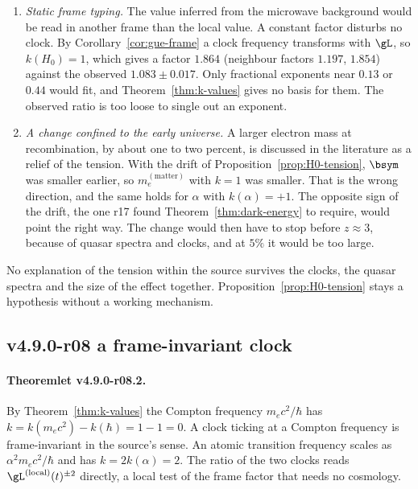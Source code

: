 \begin{enumerate}[leftmargin=2em]
\item \emph{Static frame typing.}  The value inferred from the microwave background would be read in another frame than
the local value.  A constant factor disturbs no clock.  By Corollary~\ref{cor:gue-frame} a clock frequency transforms with
\(\gL\), so \(k(H_0)=1\), which gives a factor \(1.864\) (neighbour factors \(1.197\), \(1.854\)) against the observed
\(1.083\pm0.017\).  Only fractional exponents near \(0.13\) or \(0.44\) would fit, and Theorem~\ref{thm:k-values} gives no
basis for them.  The observed ratio is too loose to single out an exponent.
\item \emph{A change confined to the early universe.}  A larger electron mass at recombination, by about one to two
percent, is discussed in the literature as a relief of the tension.  With the drift of
Proposition~\ref{prop:H0-tension}, \(\bsym\) was smaller earlier, so \(m_e^{(\mathrm{matter})}\) with \(k=1\) was smaller.
That is the wrong direction, and the same holds for \(\alpha\) with \(k(\alpha)=+1\).  The opposite sign of the drift, the one
r17 found Theorem~\ref{thm:dark-energy} to require, would point the right way.  The change would then have to stop before
\(z\approx3\), because of quasar spectra and clocks, and at \(5\%\) it would be too large.
\end{enumerate}
No explanation of the tension within the source survives the clocks, the quasar spectra and the size of the effect
together.  Proposition~\ref{prop:H0-tension} stays a hypothesis without a working mechanism.

\subsection*{v4.9.0-r08 a frame-invariant clock}
\label{subsec:v490-r08-compton}

\paragraph{Theoremlet v4.9.0-r08.2.}
By Theorem~\ref{thm:k-values} the Compton frequency \(m_ec^2/\hbar\) has \(k=k(m_ec^2)-k(\hbar)=1-1=0\).  A clock ticking
at a Compton frequency is frame-invariant in the source's sense.  An atomic transition frequency scales as
\(\alpha^2m_ec^2/\hbar\) and has \(k=2k(\alpha)=2\).  The ratio of the two clocks reads \(\gL^{(\mathrm{local})}(t)^{\pm2}\)
directly, a local test of the frame factor that needs no cosmology.

